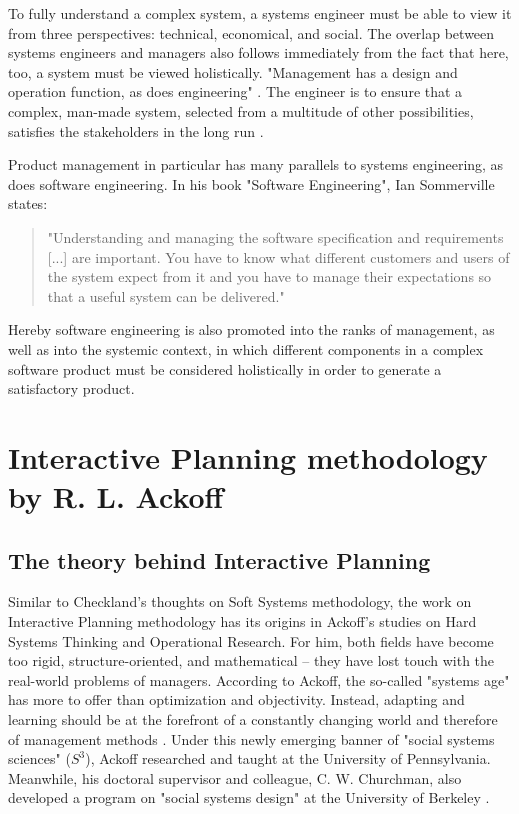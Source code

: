 \documentclass[a4paper,12pt]{article}
\begin{document}
To fully understand a complex system, a systems engineer must be able to view
it from three perspectives: technical, economical, and social.  The overlap
between systems engineers and managers also follows immediately from the fact
that here, too, a system must be viewed holistically. "Management has a design
and operation function, as does engineering" \cite{goode:1957}. The engineer
is to ensure that a complex, man-made system, selected from a multitude of
other possibilities, satisfies the stakeholders in the long run
\cite{hossain:2019}.

Product management in particular has many parallels to systems engineering, as
does software engineering. In his book "Software Engineering", Ian Sommerville
states:
\begin{quote}
"Understanding and managing the software specification and requirements [...]
  are important. You have to know what different customers and users of the
  system expect from it and you have to manage their expectations so that a
  useful system can be delivered." \cite{sommerville:2011}
\end{quote}
Hereby software engineering is also promoted into the ranks of management, as
well as into the systemic context, in which different components in a complex
software product must be considered holistically in order to generate a
satisfactory product.

\section{Interactive Planning methodology by R. L. Ackoff}

\subsection{The theory behind Interactive Planning}

Similar to Checkland's thoughts on Soft Systems methodology, the work on
Interactive Planning methodology has its origins in Ackoff's studies on Hard
Systems Thinking and Operational Research. For him, both fields have become
too rigid, structure-oriented, and mathematical -- they have lost touch with
the real-world problems of managers. According to Ackoff, the so-called
"systems age" has more to offer than optimization and objectivity. Instead,
adapting and learning should be at the forefront of a constantly changing
world and therefore of management methods \cite{ackoff:1981}.  Under this
newly emerging banner of "social systems sciences" ($S^3$), Ackoff researched
and taught at the University of Pennsylvania.  Meanwhile, his doctoral
supervisor and colleague, C. W. Churchman, also developed a program on "social
systems design" at the University of Berkeley \cite{jackson:1991}.
\end{document}
